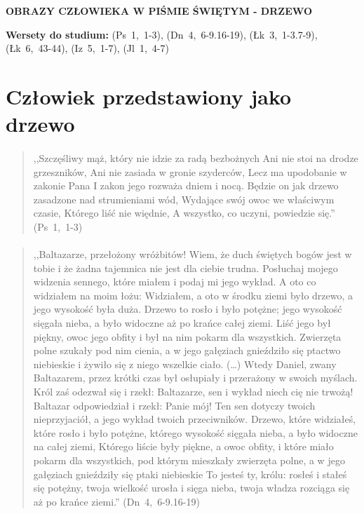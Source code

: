 \documentclass[10pt,a4paper,oneside]{article}
\begin{document}
\centerline{\textbf{\MakeUppercase{Obrazy człowieka w Piśmie Świętym - drzewo}}}
\begin{center}
\textbf{Wersety do studium:} 
\mbox{(Ps 1, 1-3)}, \mbox{(Dn 4, 6-9.16-19)}, \mbox{(Łk 3, 1-3.7-9)}, \mbox{(Łk 6, 43-44)}, \mbox{(Iz 5, 1-7)}, \mbox{(Jl 1, 4-7)}
\end{center}
\section{Człowiek przedstawiony jako drzewo}
\paragraph{}
\begin{quote}
,,Szczęśliwy mąż, który nie idzie za radą bezbożnych Ani nie stoi na drodze grzeszników, Ani nie zasiada w gronie szyderców, Lecz ma upodobanie w zakonie Pana I zakon jego rozważa dniem i nocą. Będzie on jak drzewo zasadzone nad strumieniami wód, Wydające swój owoc we właściwym czasie, Którego liść nie więdnie, A wszystko, co uczyni, powiedzie się.'' \mbox{(Ps 1, 1-3)}
\end{quote}
\paragraph{}
\begin{quote}
,,Baltazarze, przełożony wróżbitów! Wiem, że duch świętych bogów jest w tobie i że żadna tajemnica nie jest dla ciebie trudna. Posłuchaj mojego widzenia sennego, które miałem i podaj mi jego wykład. A oto co widziałem na moim łożu: Widziałem, a oto w środku ziemi było drzewo, a jego wysokość była duża. Drzewo to rosło i było potężne; jego wysokość sięgała nieba, a było widoczne aż po krańce całej ziemi. Liść jego był piękny, owoc jego obfity i był na nim pokarm dla wszystkich. Zwierzęta polne szukały pod nim cienia, a w jego gałęziach gnieździło się ptactwo niebieskie i żywiło się z niego wszelkie ciało. (\ldots) Wtedy Daniel, zwany Baltazarem, przez krótki czas był osłupiały i przerażony w swoich myślach. Król zaś odezwał się i rzekł: Baltazarze, sen i wykład niech cię nie trwożą! Baltazar odpowiedział i rzekł: Panie mój! Ten sen dotyczy twoich nieprzyjaciół, a jego wykład twoich przeciwników. Drzewo, które widziałeś, które rosło i było potężne, którego wysokość sięgała nieba, a było widoczne na całej ziemi, Którego liście były piękne, a owoc obfity, i które miało pokarm dla wszystkich, pod którym mieszkały zwierzęta polne, a w jego gałęziach gnieździły się ptaki niebieskie To jesteś ty, królu: rosłeś i stałeś się potężny, twoja wielkość urosła i sięga nieba, twoja władza rozciąga się aż po krańce ziemi.'' \mbox{(Dn 4, 6-9.16-19)}
\end{quote}
\end{document}
